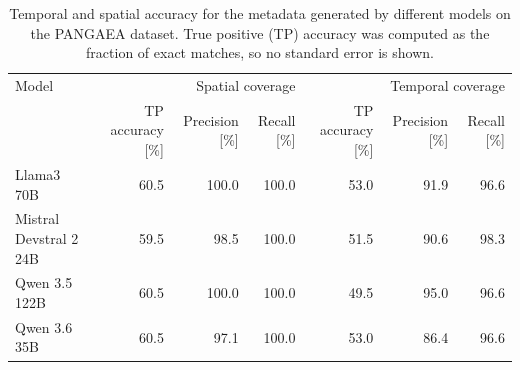 \begin{table}[h]
\caption{Temporal and spatial accuracy for the metadata generated by different models on the PANGAEA dataset. True positive (TP) accuracy was computed as the fraction of exact matches, so no standard error is shown.}
\label{tab:results_pan_spat_temp}
\begin{tabular}{lrrrrrr}
\toprule
Model & \multicolumn{3}{r}{Spatial coverage} & \multicolumn{3}{r}{Temporal coverage} \\
 & TP accuracy [\%] & Precision [\%] & Recall [\%] & TP accuracy [\%] & Precision [\%] & Recall [\%] \\
\midrule
Llama3 70B & 60.5 & 100.0 & 100.0 & 53.0 & 91.9 & 96.6 \\
Mistral Devstral 2 24B & 59.5 & 98.5 & 100.0 & 51.5 & 90.6 & 98.3 \\
Qwen 3.5 122B & 60.5 & 100.0 & 100.0 & 49.5 & 95.0 & 96.6 \\
Qwen 3.6 35B & 60.5 & 97.1 & 100.0 & 53.0 & 86.4 & 96.6 \\
\bottomrule
\end{tabular}
\end{table}
